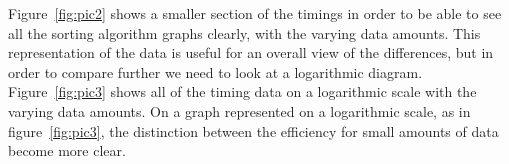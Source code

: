 Figure~\ref{fig:pic2} shows a smaller section of the timings in order to be able to see all the sorting algorithm graphs clearly, with the varying data amounts. This representation of the data is useful for an overall view of the differences, but in order to compare further we need to look at a logarithmic diagram. 
\\
Figure~\ref{fig:pic3} shows all of the timing data on a logarithmic scale with the varying data amounts. On a graph represented on a logarithmic scale, as in figure~\ref{fig:pic3}, the distinction between the efficiency for small amounts of data become more clear.








